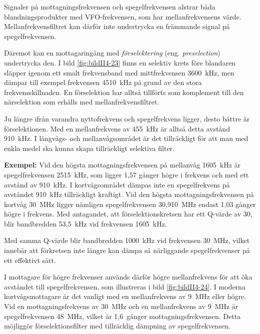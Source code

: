 Signaler på mottagningsfrekvensen och spegelfrekvensen alstrar båda
blandningsprodukter med VFO-frekvensen, som har mellanfrekvensens värde.
Mellanfrekvensfiltret kan därför inte undertrycka en främmande signal på
spegelfrekvensen.


Däremot kan en mottagaringång med \emph{förselektering} (eng.
\emph{preselection}) undertrycka den.
I bild \ref{fig:bildII4-23} finns en selektiv krets före blandaren släpper
igenom ett smalt frekvensband med mittfrekvensen 3600~kHz, men dämpar till exempel
frekvensen 4510~kHz på grund av den stora frekvensskillnaden.
En förselektion har alltså tillförts som komplement till den närselektion som
erhålls med mellanfrekvensfiltret.


Ju längre ifrån varandra nyttofrekvens och spegelfrekvens ligger, desto bättre
är förselektionen.
Med en mellanfrekvens av 455~kHz är alltså detta avstånd 910~kHz.
I långvågs- och mellanvågsområdet är det tillräckligt för att man med enkla
medel ska kunna skapa tillräckligt selektiva filter.

\textbf{Exempel:}
Vid den högsta mottagningsfrekvensen på mellanvåg 1605~kHz är spegelfrekvensen
2515~kHz, som ligger 1,57 gånger högre i frekvens och med ett avstånd av
910~kHz.
I kortvågsområdet dämpas inte en spegelfrekvens på avståndet 910~kHz
tillräckligt kraftigt.
Vid den högsta mottagningsfrekvensen på kortvåg 30~MHz ligger nämligen
spegelfrekvensen 30,910~MHz endast 1,03 gånger högre i frekvens.
Med antagandet, att förselektionskretsen har ett Q-värde av 30, blir
bandbredden 53,5~kHz vid frekvensen 1605~kHz.

Med samma Q-värde blir bandbredden 1000~kHz vid frekvensen 30~MHz, vilket
innebär att förkretsen inte längre kan dämpa så närliggande spegelfrekvenser
på ett effektivt sätt.

I mottagare för högre frekvenser används därför högre mellanfrekvens
för att öka avståndet till spegelfrekvensen, som illustreras i bild
\ref{fig:bildII4-24}.
I moderna kortvågsmottagare är det vanligt med en mellanfrekvens av 9~MHz
eller högre.
Vid en mottagningsfrekvens av 30~MHz och en mellanfrekvens av 9~MHz är
spegelfrekvensen 48~MHz, vilket är 1,6~gånger mottagningsfrekvensen.
Detta möjliggör förselektionsfilter med tillräcklig dämpning av
spegelfrekvensen.

